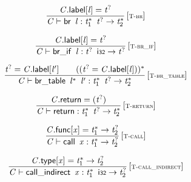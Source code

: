 \vspace{1ex}

$$
\begin{array}{@{}c@{}}\displaystyle
\frac{
{\mathit{C}}.\mathsf{label}{}[{\mathit{l}}] = {{\mathit{t}}^?}
}{
{\mathit{C}} \vdash \mathsf{br}~\,{\mathit{l}} : {{\mathit{t}}_{{1}}^\ast}~\,{{\mathit{t}}^?} \rightarrow {{\mathit{t}}_{{2}}^\ast}
} \, {[\textsc{\scriptsize T{-}br}]}
\qquad
\end{array}
$$

$$
\begin{array}{@{}c@{}}\displaystyle
\frac{
{\mathit{C}}.\mathsf{label}{}[{\mathit{l}}] = {{\mathit{t}}^?}
}{
{\mathit{C}} \vdash \mathsf{br\_if}~\,{\mathit{l}} : {{\mathit{t}}^?}~\,\mathsf{i{\scriptstyle32}} \rightarrow {{\mathit{t}}^?}
} \, {[\textsc{\scriptsize T{-}br\_if}]}
\qquad
\end{array}
$$

$$
\begin{array}{@{}c@{}}\displaystyle
\frac{
{{\mathit{t}}^?} = {\mathit{C}}.\mathsf{label}{}[{\mathit{l}'}]
 \qquad
(({{\mathit{t}}^?} = {\mathit{C}}.\mathsf{label}{}[{\mathit{l}}]))^\ast
}{
{\mathit{C}} \vdash \mathsf{br\_table}~\,{{\mathit{l}}^\ast}~\,{\mathit{l}'} : {{\mathit{t}}_{{1}}^\ast}~\,{{\mathit{t}}^?} \rightarrow {{\mathit{t}}_{{2}}^\ast}
} \, {[\textsc{\scriptsize T{-}br\_table}]}
\qquad
\end{array}
$$

\vspace{1ex}

$$
\begin{array}{@{}c@{}}\displaystyle
\frac{
{\mathit{C}}.\mathsf{return} = ({{\mathit{t}}^?})
}{
{\mathit{C}} \vdash \mathsf{return} : {{\mathit{t}}_{{1}}^\ast}~\,{{\mathit{t}}^?} \rightarrow {{\mathit{t}}_{{2}}^\ast}
} \, {[\textsc{\scriptsize T{-}return}]}
\qquad
\end{array}
$$

$$
\begin{array}{@{}c@{}}\displaystyle
\frac{
{\mathit{C}}.\mathsf{func}{}[{\mathit{x}}] = {{\mathit{t}}_{{1}}^\ast} \rightarrow {{\mathit{t}}_{{2}}^?}
}{
{\mathit{C}} \vdash \mathsf{call}~\,{\mathit{x}} : {{\mathit{t}}_{{1}}^\ast} \rightarrow {{\mathit{t}}_{{2}}^?}
} \, {[\textsc{\scriptsize T{-}call}]}
\qquad
\end{array}
$$

$$
\begin{array}{@{}c@{}}\displaystyle
\frac{
{\mathit{C}}.\mathsf{type}{}[{\mathit{x}}] = {{\mathit{t}}_{{1}}^\ast} \rightarrow {{\mathit{t}}_{{2}}^?}
}{
{\mathit{C}} \vdash \mathsf{call\_indirect}~\,{\mathit{x}} : {{\mathit{t}}_{{1}}^\ast}~\,\mathsf{i{\scriptstyle32}} \rightarrow {{\mathit{t}}_{{2}}^?}
} \, {[\textsc{\scriptsize T{-}call\_indirect}]}
\qquad
\end{array}
$$


